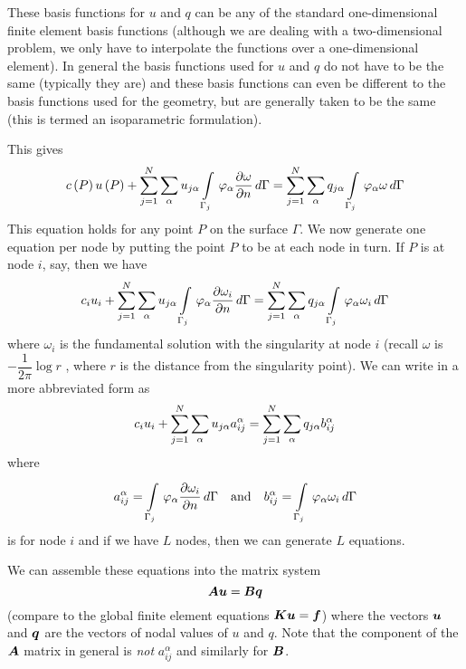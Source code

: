These basis functions for $u$ and $q$ can be any of the standard
one-dimensional finite element basis functions (although we are dealing with a
two-dimensional problem, we only have to interpolate the functions over a
one-dimensional element).  In general the basis functions used for $u$ and $q$
do not have to be the same (typically they are) and these basis functions can
even be different to the basis functions used for the geometry, but are
generally taken to be the same (this is termed an 
isoparametric formulation).

This gives
\begin{equation}
   c\left( P \right)   u\left( P \right) +  \displaystyle\sum_{j=1}^{N}   \displaystyle\sum_{\alpha}^{}  u_{j\alpha} 
    \displaystyle\int\limits_{\Gamma_{j}}^{} \, \varphi_{\alpha}   \dfrac{\partial \omega}{\partial n} \,d\Gamma  = 
   \displaystyle\sum_{j=1}^{N}  \displaystyle\sum_{\alpha}^{} 
  q_{j\alpha}  \displaystyle\int\limits_{\Gamma_{j}}^{} \, \varphi_{\alpha}  \omega\,d\Gamma 
  \label{eqn:isopar}
\end{equation}
This equation holds for any point $P$ on the surface $\Gamma$.  We now
generate one equation per node by putting the point $P$ to be at each node in
turn.  If $P$ is at node $i$, say, then we have
\begin{equation}
  c_{i}u_{i}+ \displaystyle\sum_{j=1}^{N}   \displaystyle\sum_{\alpha}^{}  u_{j\alpha} 
    \displaystyle\int\limits_{\Gamma_{j}}^{} \, \varphi_{\alpha}   \dfrac{\partial \omega_i}{\partial n} \,d\Gamma   = 
   \displaystyle\sum_{j=1}^{N}  \displaystyle\sum_{\alpha}^{}  q_{j\alpha}  \displaystyle\int\limits_{\Gamma_{j}}^{} \, \varphi_{\alpha}  
  \omega_{i}\,d\Gamma 
  \label{eqn:isopar2}
\end{equation}
where $\omega_{i}$ is the fundamental solution with the singularity at node $i$
(recall $\omega$ is $-\dfrac{1}{2 \pi} \log r$ , where $r$ is the distance from the
singularity point). We can write  in a more abbreviated form
as
\begin{equation}
  c_{i} u_{i} +  \displaystyle\sum_{j=1}^{N}   \displaystyle\sum_{\alpha}^{}  u_{j\alpha}a_{ij}^{\alpha} =
   \displaystyle\sum_{j=1}^{N}   \displaystyle\sum_{\alpha}^{}  q_{j\alpha}b_{ij}^{\alpha}
  \label{eqn:isopar3}
\end{equation}
where
\begin{equation}
  a_{ij}^{\alpha} =   \displaystyle\int\limits_{\Gamma_{j}}^{} \, \varphi_{\alpha} 
     \dfrac{\partial \omega_i}{\partial n} \,d\Gamma  \quad \text{and} \quad  b_{ij}^{\alpha} = 
    \displaystyle\int\limits_{\Gamma_{j}}^{} \, \varphi_{\alpha}  \omega_{i}\,d\Gamma 
  \label{eqn:isopar4}
\end{equation}
 is for node $i$ and if we have $L$ nodes, then we can
generate $L$ equations.  

We can assemble these equations into the matrix system
\begin{equation}
  \matr{A}\vectr{u} = \matr{B}\vectr{q}
  \label{eqn:ms}
\end{equation}
(compare to the global finite element equations $\matr{K}\vectr{u} = \vectr{f}$)
where the vectors $\boldsymbol{u}$ and $\boldsymbol{q}$ are the vectors of nodal values of
$u$ and $q$.  Note that the  component of the $\matr{A}$ matrix in general
is \emph{not} $a_{ij}^{\alpha}$ and similarly for $\matr{B}$.

